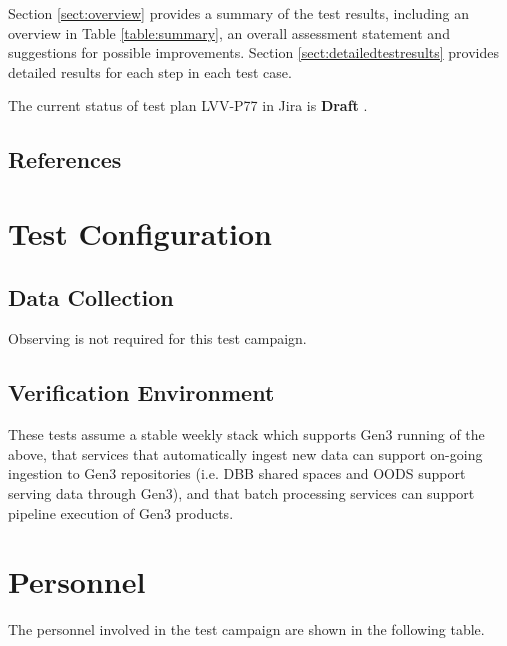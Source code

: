 \documentclass[DM,lsstdraft,STR,toc]{lsstdoc}
\begin{document}
Section \ref{sect:overview} provides a summary of the test results, including an overview in Table \ref{table:summary},
an overall assessment statement and suggestions for possible improvements.
Section \ref{sect:detailedtestresults} provides detailed results for each step in each test case.

The current status of test plan LVV-P77 in Jira is \textbf{ Draft }.

\subsection{References}
\label{sect:references}
\renewcommand{\refname}{}

\section{Test Configuration}
\label{sect:configuration}

\subsection{Data Collection}

  Observing is not required for this test campaign.

\subsection{Verification Environment}
\label{sect:hwconf}
  These tests assume a stable weekly stack which supports Gen3 running of
the above, that services that automatically ingest new data can support
on-going ingestion to Gen3 repositories (i.e. DBB shared spaces and OODS
support serving data through Gen3), and that batch processing services
can support pipeline execution of Gen3 products.




\newpage
\section{Personnel}
\label{sect:personnel}

The personnel involved in the test campaign are shown in the following table.
\end{document}
